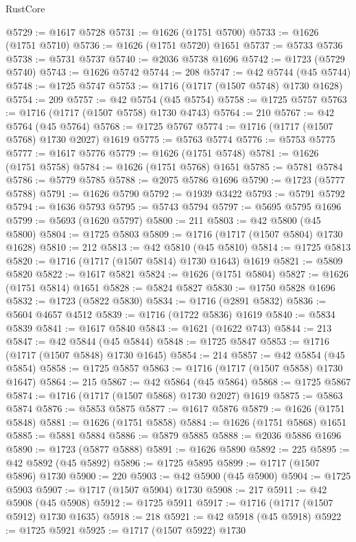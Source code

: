\begin{lexlean}{RustCore}
\begin{coremodule}
@5729 := @1617 @5728
@5731 := @1626 (@1751 @5700)
@5733 := @1626 (@1751 @5710)
@5736 := @1626 (@1751 @5720) @1651
@5737 := @5733 @5736
@5738 := @5731 @5737
@5740 := @2036 @5738 @1696
@5742 := @1723 (@5729 @5740)
@5743 := @1626 @5742
@5744 := 208
@5747 := @42 @5744 (@45 @5744)
@5748 := @1725 @5747
@5753 := @1716 (@1717 (@1507 @5748) @1730 @1628)
@5754 := 209
@5757 := @42 @5754 (@45 @5754)
@5758 := @1725 @5757
@5763 := @1716 (@1717 (@1507 @5758) @1730 @4743)
@5764 := 210
@5767 := @42 @5764 (@45 @5764)
@5768 := @1725 @5767
@5774 := @1716 (@1717 (@1507 @5768) @1730 @2027) @1619
@5775 := @5763 @5774
@5776 := @5753 @5775
@5777 := @1617 @5776
@5779 := @1626 (@1751 @5748)
@5781 := @1626 (@1751 @5758)
@5784 := @1626 (@1751 @5768) @1651
@5785 := @5781 @5784
@5786 := @5779 @5785
@5788 := @2075 @5786 @1696
@5790 := @1723 (@5777 @5788)
@5791 := @1626 @5790
@5792 := @1939 @3422
@5793 := @5791 @5792
@5794 := @1636 @5793
@5795 := @5743 @5794
@5797 := @5695 @5795 @1696
@5799 := @5693 (@1620 @5797)
@5800 := 211
@5803 := @42 @5800 (@45 @5800)
@5804 := @1725 @5803
@5809 := @1716 (@1717 (@1507 @5804) @1730 @1628)
@5810 := 212
@5813 := @42 @5810 (@45 @5810)
@5814 := @1725 @5813
@5820 := @1716 (@1717 (@1507 @5814) @1730 @1643) @1619
@5821 := @5809 @5820
@5822 := @1617 @5821
@5824 := @1626 (@1751 @5804)
@5827 := @1626 (@1751 @5814) @1651
@5828 := @5824 @5827
@5830 := @1750 @5828 @1696
@5832 := @1723 (@5822 @5830)
@5834 := @1716 (@2891 @5832)
@5836 := @5604 @4657 @4512
@5839 := @1716 (@1722 @5836) @1619
@5840 := @5834 @5839
@5841 := @1617 @5840
@5843 := @1621 (@1622 @743)
@5844 := 213
@5847 := @42 @5844 (@45 @5844)
@5848 := @1725 @5847
@5853 := @1716 (@1717 (@1507 @5848) @1730 @1645)
@5854 := 214
@5857 := @42 @5854 (@45 @5854)
@5858 := @1725 @5857
@5863 := @1716 (@1717 (@1507 @5858) @1730 @1647)
@5864 := 215
@5867 := @42 @5864 (@45 @5864)
@5868 := @1725 @5867
@5874 := @1716 (@1717 (@1507 @5868) @1730 @2027) @1619
@5875 := @5863 @5874
@5876 := @5853 @5875
@5877 := @1617 @5876
@5879 := @1626 (@1751 @5848)
@5881 := @1626 (@1751 @5858)
@5884 := @1626 (@1751 @5868) @1651
@5885 := @5881 @5884
@5886 := @5879 @5885
@5888 := @2036 @5886 @1696
@5890 := @1723 (@5877 @5888)
@5891 := @1626 @5890
@5892 := 225
@5895 := @42 @5892 (@45 @5892)
@5896 := @1725 @5895
@5899 := @1717 (@1507 @5896) @1730
@5900 := 220
@5903 := @42 @5900 (@45 @5900)
@5904 := @1725 @5903
@5907 := @1717 (@1507 @5904) @1730
@5908 := 217
@5911 := @42 @5908 (@45 @5908)
@5912 := @1725 @5911
@5917 := @1716 (@1717 (@1507 @5912) @1730 @1635)
@5918 := 218
@5921 := @42 @5918 (@45 @5918)
@5922 := @1725 @5921
@5925 := @1717 (@1507 @5922) @1730

\end{coremodule}
\end{lexlean}
